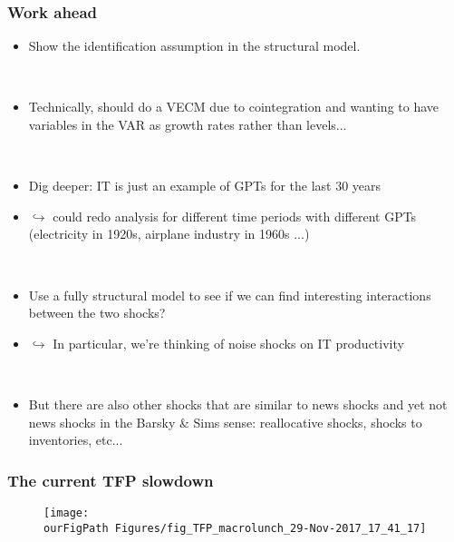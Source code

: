 \documentclass{beamer}
\def \ourFigPath {../../}
\begin{document}
\begin{frame}
	\frametitle{Work ahead} 
	
\begin{itemize}

\item Show the identification assumption in the structural model. 

\

\item Technically, should do a VECM due to cointegration and wanting to have variables in the VAR as growth rates rather than levels...

\

\item Dig deeper: IT is just an example of GPTs for the last 30 years
\item[] $\hookrightarrow$ could redo analysis for different time periods with different GPTs (electricity in 1920s, airplane industry in 1960s ...)

\


\item Use a fully structural model to see if we can find interesting interactions between the two shocks?
\item [] $\hookrightarrow$ In particular, we're thinking of noise shocks on IT productivity

\	
	
\item But there are also other shocks that are similar to news shocks and yet not news shocks in the Barsky \& Sims sense: reallocative shocks, shocks to inventories, etc...  
\end{itemize}


   		 	
\end{frame}






\begin{frame}
	\frametitle{The current TFP slowdown}
	
	
	\vspace{-1cm}
	\noindent
	\begin{figure}
		\centering
		\texttt{[image: \\ourFigPath Figures/fig\_TFP\_macrolunch\_29-Nov-2017\_17\_41\_17]}
	\end{figure}
	
	
\end{frame}
\end{document}
